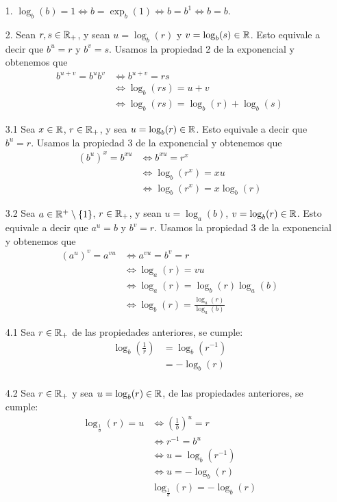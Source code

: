 \begin{enumerate}
\item[1.] $\log_b(b)=1\Leftrightarrow b=\exp_b(1)\Leftrightarrow b=b^1\Leftrightarrow b=b$.
\item[2.] Sean $r,s\in\mathbb{R}_+$, y sean $u=\log_b(r)$ y $v=\log_b(s)\in\mathbb{R}$.
Esto equivale a decir que $b^u=r$ y $b^v=s$.
Usamos la propiedad 2 de la exponencial y obtenemos que 
\begin{align*} 
b^{u+v}=b^ub^v&\Leftrightarrow b^{u+v}=rs\\
&\Leftrightarrow \log_b(rs)=u+v\\
&\Leftrightarrow \log_b(rs)=\log_b(r)+\log_b(s)
\end{align*}

\item[3.1] Sea $x\in\mathbb{R}$, $r\in\mathbb{R}_+$, y sea $u=\log_b(r)\in\mathbb{R}$.
Esto equivale a decir que $b^u=r$.
Usamos la propiedad 3 de la exponencial y obtenemos que 
\begin{align*} 
(b^{u})^x=b^{xu}&\Leftrightarrow b^{xu}=r^x\\
&\Leftrightarrow \log_b(r^x)=xu\\
&\Leftrightarrow \log_b(r^x)=x\log_b(r)
\end{align*}

\item[3.2] 
Sea $a \in \mathbb{R}^+\setminus\{1\}$, $r\in\mathbb{R}_+$, y sean $u=\log_a(b)$, $v=\log_b(r)\in\mathbb{R}$.
Esto equivale a decir que $a^u=b$ y $b^v=r$.
Usamos la propiedad 3 de la exponencial y obtenemos que 
\begin{align*} 
(a^{u})^v=a^{vu}&\Leftrightarrow a^{vu}=b^v=r\\
&\Leftrightarrow \log_a(r)=vu\\
&\Leftrightarrow \log_a(r)=\log_b(r)\log_a(b)\\
&\Leftrightarrow \log_b(r)=\frac{\log_a(r)}{\log_a(b)}
\end{align*}

\item[4.1] Sea $r\in\mathbb{R}_+$ de las propiedades anteriores, se cumple:
\begin{align*}
\log_b\left(\frac{1}{r}\right)&=\log_b(r^{-1})\\
&=-\log_b(r)\\
\end{align*}

\item[4.2] Sea $r\in\mathbb{R}_+$ y sea $u=\log_b(r)\in\mathbb{R}$, de las propiedades anteriores, se cumple:
\begin{align*}
\log_{\frac{1}{b}}(r)=u&\Leftrightarrow \left(\frac{1}{b}\right)^u=r\\
&\Leftrightarrow r^{-1}=b^u\\
&\Leftrightarrow u=\log_b(r^{-1})\\
&\Leftrightarrow u=-\log_b(r)\\
&\log_{\frac{1}{b}}(r)=-\log_b(r)\\
\end{align*}


\end{enumerate}
